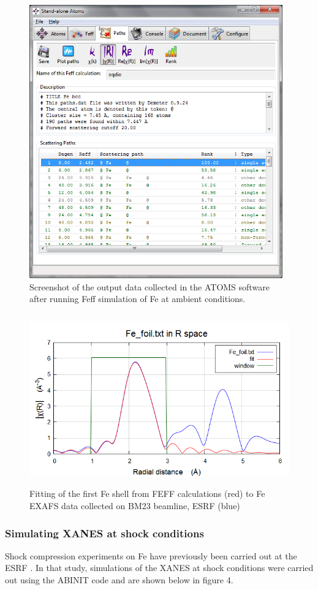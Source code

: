 \begin{figure}
  \includegraphics[width=4.3063in,height=4.6465in]{figures/Task42210-img002.png}
  \caption{%
    Screenshot of the output data collected in the ATOMS software after
    running Feff simulation of Fe at ambient conditions.
  }
  \label{fig:xafs_fig2}
\end{figure}

\begin{figure}
  \includegraphics[width=4.852in,height=2.9173in]{figures/Task42210-img003.png}
  \caption{%
    Fitting of the first Fe shell from FEFF calculations (red) to Fe EXAFS
    data collected on BM23 beamline, ESRF (blue)
  }
  \label{fig:xafs_fig3}
\end{figure}

\subsubsection{Simulating XANES at shock conditions}
Shock compression experiments on Fe have previously been carried out at the ESRF
\cite{Torchio2016}. In that study,
simulations of the XANES at shock conditions were carried out using the ABINIT
code and are shown below in figure 4.


